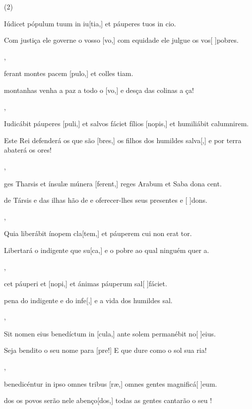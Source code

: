 \SetVersePairs(2){
  {\item {}Iúdicet pópulum tuum in iu[tia,] et páuperes tuos in cio.~\Responsorium}%
    {\item {}Com justiça ele governe o vosso [vo,] com equidade ele julgue os vos[ ]{po}bres.~\Responsorium},
  {\item {}ferant montes pacem [pulo,] et colles \-ti\-am.~\Responsorium}%
    {\item {} montanhas venha a paz a todo o [vo,] e desça das colinas a ça!~\Responsorium},
  {\item {}Iudicábit páuperes [puli,] et salvos fáciet fílios [no\-pis,] et humiliábit calumnirem.~\Responsorium}%
    {\item {}Este Rei defenderá os que são [bres,] os filhos dos humildes salva[,] e por terra abaterá os ores!~\Responsorium},
  {\item {}ges Tharsis et ínsulæ múnera [ferent,] reges Arabum et Saba dona cent.~\Responsorium}%
    {\item {} de Társis e das ilhas hão de  e oferecer-lhes seus presentes e [ ]{dons}.~\Responsorium},
  {\item {}Quia liberábit ínopem cla[tem,] et páuperem cui non erat tor.~\Responsorium}%
    {\item {}Libertará o indigente que su[ca,] e o pobre ao qual ninguém quer a.~\Responsorium},
  {\item {}cet páuperi et [nopi,] et ánimas páuperum sal[ ]{fá}\-ci\-et.~\Responsorium}%
    {\item {} pena do indigente e do infe[,] e a vida dos humildes sal.~\Responsorium},
  {\item {}Sit nomen eius benedíctum in [cula,] ante solem permanébit no[ ]{e}ius.~\Responsorium}%
    {\item {}Seja bendito o seu nome para [pre!] E que dure como o sol sua ria!~\Responsorium},
  {\item {} benedicéntur in ipso omnes tribus [ræ,] omnes gentes magnificá[ ]{e}um.~\Responsorium}%
    {\item {}dos os povos serão nele abenço[dos,] todas as gentes cantarão o seu !~\Responsorium}
}